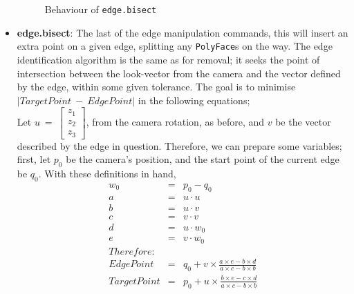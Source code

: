 \documentclass[a4paper,10pt]{report}
\begin{document}
\begin{itemize}
\begin{figure}
  \begin{center}
  \hspace{-10px}
  \caption{Behaviour of \texttt{edge.bisect}}
  \label{edgesplit}
  \end{center}
\end{figure}

\item{\textbf{edge.bisect}: The last of the edge manipulation commands, this will insert an extra point on a given edge, splitting any \texttt{PolyFace}s on the way. The edge identification algorithm is the same as for removal; it seeks the point of intersection between the look-vector from the camera and the vector defined by the edge, within some given tolerance. The goal is to minimise $|TargetPoint ~-~ EdgePoint|$ in the following equations;
\\	
        
Let $u ~=~ \left[ 
  \begin{array}{c}
    z_1 \\ 
    z_2 \\ 
    z_3 
  \end{array}\right]$, from the camera rotation, as before, and $v$ be the vector described by the edge in question. Therefore, we can prepare some variables; first, let $p_0$ be the camera's position, and the start point of the current edge be $q_0$. With these definitions in hand,
\begin{eqnarray*}
  w_0 &=& p_0 - q_0 \\
  a &=& u \cdot u \\
  b &=& u \cdot v \\
  c &=& v \cdot v \\
  d &=& u \cdot w_0 \\
  e &=& v \cdot w_0 \\
  Therefore:\\
  EdgePoint &=& q_0 + v \times \frac{a \times e - b \times d}{a \times c - b \times b} \\
  TargetPoint &=& p_0 + u \times \frac{b \times e - c \times d}{a \times c - b \times b}
\end{eqnarray*}

}
\end{itemize}
\end{document}
